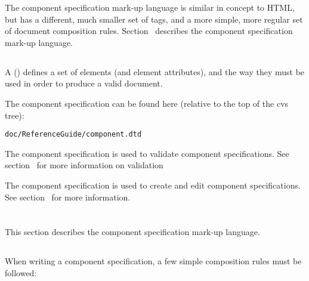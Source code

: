 \documentclass[11pt]{article}
\begin{document}
The component specification mark-up language is similar in concept to HTML, but
has a different, much smaller set of tags, and a more simple, more
regular set of document composition rules.
Section~\sechyperref{\SECcontent} describes
the component specification mark-up language.

\subsection{\SUBSECwhatDtd}
\label{\SUBSECwhatDtd}

A  (\dtd) defines a set of elements (and
element attributes), and the way they must be used in order to produce a
valid \xml{} document.

The component specification \dtd{} can be found here (relative to the top
of the cvs tree):

\begin{verbatim}
doc/ReferenceGuide/component.dtd
\end{verbatim}

The component specification \dtd{} is used to validate component
specifications. See 
section~\sechyperref{\SECvalidation} for more information on validation

The component specification \dtd{} is used to create and edit component
specifications.  See
section~\sechyperref{\SECediting} for more
information.

\section{\SECcontent}
\label{\SECcontent}

This section describes the component specification mark-up language.

\subsection{\SUBSECrules}
\label{\SUBSECrules}

When writing a component specification, a few simple composition rules
must be followed:
\end{document}
